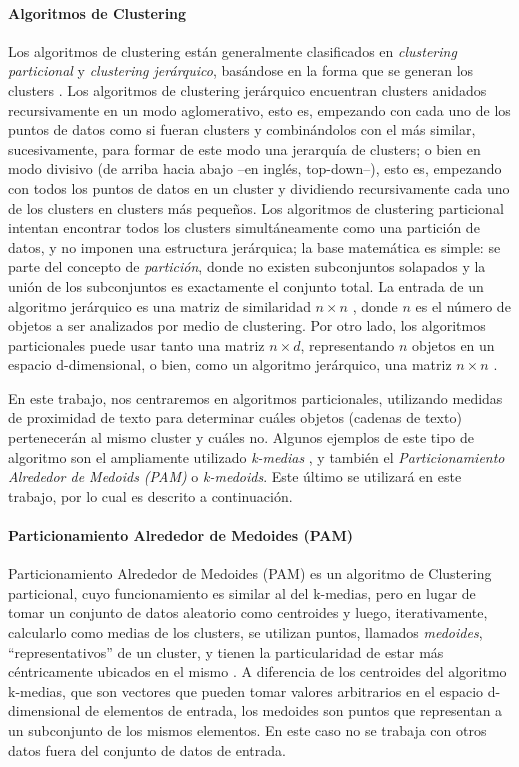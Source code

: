 \paragraph{Algoritmos de Clustering}\label{sec:algoritmos_clustering}
Los algoritmos de clustering están generalmente clasificados en \textit{clustering particional} y \textit{clustering jerárquico}, basándose en la forma que se generan los clusters \citep{xu2008clustering}. Los algoritmos de clustering jerárquico encuentran clusters anidados recursivamente en un modo aglomerativo, esto es, empezando con cada uno de los puntos de datos como si fueran clusters y combinándolos con el más similar, sucesivamente, para formar de este modo una jerarquía de clusters; o bien en modo divisivo (de arriba hacia abajo --en inglés, top-down--), esto es, empezando con todos los puntos de datos en un cluster y dividiendo recursivamente cada uno de los clusters en clusters más pequeños. Los algoritmos de clustering particional intentan encontrar todos los clusters simultáneamente como una partición de datos, y no imponen una estructura jerárquica; la base matemática es simple: se parte del concepto de \textit{partición}, donde no existen subconjuntos solapados y la unión de los subconjuntos es exactamente el conjunto total. La entrada de un algoritmo jerárquico es una matriz de similaridad \(n \times n\) , donde \(n\) es el número de objetos a ser analizados por medio de clustering. Por otro lado, los algoritmos particionales puede usar tanto una matriz \(n \times d\), representando \(n\) objetos en un espacio d-dimensional, o bien, como un algoritmo jerárquico, una matriz \(n \times n\) \citep{jain2010data}.

\bigskip En este trabajo, nos centraremos en algoritmos particionales, utilizando medidas de proximidad de texto para determinar cuáles objetos (cadenas de texto) pertenecerán al mismo cluster y cuáles no. Algunos ejemplos de este tipo de algoritmo son el ampliamente utilizado \textit{k-medias} \citep{macqueen1967some}, y también el \textit{Particionamiento Alrededor de Medoids (PAM)} o \textit{k-medoids}. Este último se utilizará en este trabajo, por lo cual es descrito a continuación.

\paragraph{Particionamiento Alrededor de Medoides (PAM)}
Particionamiento Alrededor de Medoides (PAM) es un algoritmo de Clustering particional, cuyo funcionamiento es similar al del k-medias, pero en lugar de tomar un conjunto de datos aleatorio como centroides y luego, iterativamente, calcularlo como medias de los clusters, se utilizan puntos, llamados \textit{medoides}, “representativos” de un cluster, y tienen la particularidad de estar más céntricamente ubicados en el mismo \citep{rdusseeun1987clustering}. A diferencia de los centroides del algoritmo k-medias, que son vectores que pueden tomar valores arbitrarios en el espacio d-dimensional de elementos de entrada, los medoides son puntos que representan a un subconjunto de los mismos elementos. En este caso no se trabaja con otros datos fuera del conjunto de datos de entrada.

